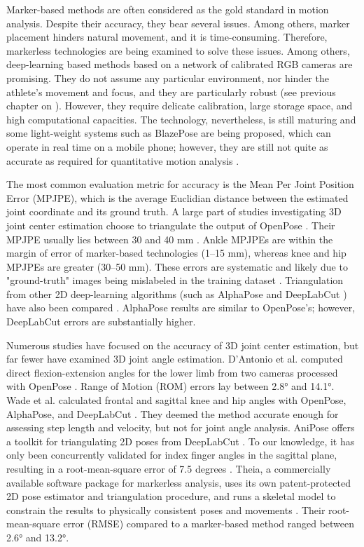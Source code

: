 Marker-based methods are often considered as the gold standard in motion analysis. Despite their accuracy, they bear several issues. Among others, marker placement hinders natural movement, and it is time-consuming. Therefore, markerless technologies are being examined to solve these issues. Among others, deep-learning based methods based on a network of calibrated RGB cameras are promising. They do not assume any particular environment, nor hinder the athlete’s movement and focus, and they are particularly robust (see previous chapter on  \cite{Pagnon2021}). However, they require delicate calibration, large storage space, and high computational capacities. The technology, nevertheless, is still maturing and some light-weight systems such as BlazePose \cite{Bazarevsky2020} are being proposed, which can operate in real time on a mobile phone; however, they are still not quite as accurate as required for quantitative motion analysis \cite{Mroz2021}.

The most common evaluation metric for accuracy is the Mean Per Joint Position Error (MPJPE), which is the average Euclidian distance between the estimated joint coordinate and its ground truth. A large part of studies investigating 3D joint center estimation choose to triangulate the output of OpenPose \cite{Cao2019}. Their MPJPE usually lies between 30 and 40 mm \cite{Nakano2019,Slembrouck2020,Labuguen2020}. Ankle MPJPEs are within the margin of error of marker-based technologies (1–15 mm), whereas knee and hip MPJPEs are greater (30–50 mm). These errors are systematic and likely due to "ground-truth" images being mislabeled in the training dataset \cite{Needham2021b}. Triangulation from other 2D deep-learning algorithms (such as AlphaPose \cite{Fang2017} and DeepLabCut \cite{Mathis2018}) have also been compared \cite{Needham2021b}. AlphaPose results are similar to OpenPose’s; however, DeepLabCut errors are substantially higher.

Numerous studies have focused on the accuracy of 3D joint center estimation, but far fewer have examined 3D joint angle estimation. D’Antonio et al. computed direct flexion-extension angles for the lower limb from two cameras processed with OpenPose \cite{D'Antonio2021}. Range of Motion (ROM) errors lay between 2.8° and 14.1°. Wade et al. calculated frontal and sagittal knee and hip angles with OpenPose, AlphaPose, and DeepLabCut \cite{Wade2021}. They deemed the method accurate enough for assessing step length and velocity, but not for joint angle analysis. AniPose offers a toolkit for triangulating 2D poses from DeepLabCut \cite{Karashchuk2021}. To our knowledge, it has only been concurrently validated for index finger angles in the sagittal plane, resulting in a root-mean-square error of 7.5 degrees \cite{Geelen2021}. Theia, a commercially available software package for markerless analysis, uses its own patent-protected 2D pose estimator and triangulation procedure, and runs a skeletal model to constrain the results to physically consistent poses and movements \cite{Kanko2021b}. Their root-mean-square error (RMSE) compared to a marker-based method ranged between 2.6° and 13.2°.

